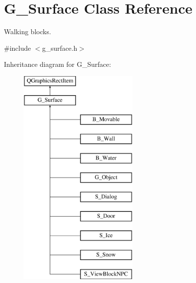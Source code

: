 \hypertarget{class_g___surface}{}\section{G\+\_\+\+Surface Class Reference}
\label{class_g___surface}


Walking blocks.  




{\ttfamily \#include $<$g\+\_\+surface.\+h$>$}

Inheritance diagram for G\+\_\+\+Surface\+:\begin{figure}[H]
\begin{center}
\leavevmode
\includegraphics[height=11.000000cm]{class_g___surface}
\end{center}
\end{figure}
